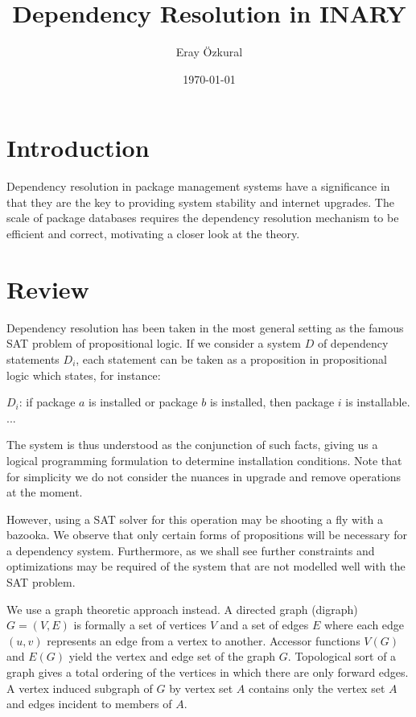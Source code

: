 \documentclass[a4paper,11pt]{article}
\title{ Dependency Resolution in INARY}
\author{Eray \"{O}zkural}
\date{\today}
\begin{document}
\maketitle

\section{Introduction}

Dependency resolution in package management systems have a
significance in that they are the key to providing system stability
and internet upgrades. The scale of package databases requires the
dependency resolution mechanism to be efficient and correct,
motivating a closer look at the theory.


\section{Review}

Dependency resolution has been taken in the most general setting as
the famous SAT problem of propositional logic. If we consider a system
$D$ of dependency statements $D_i$, each statement can be taken as a
proposition in propositional logic which states, for instance:

$D_i$: if package $a$ is installed or package $b$ is installed, then
package $i$ is installable.\\
...

The system is thus understood as the conjunction of such facts, giving
us a logical programming formulation to determine installation
conditions. Note that for simplicity we do not consider the nuances in
upgrade and remove operations at the moment.

However, using a SAT solver for this operation may be shooting a fly
with a bazooka. We observe that only certain forms of propositions
will be necessary for a dependency system. Furthermore, as we shall
see further constraints and optimizations may be required of the
system that are not modelled well with the SAT problem.

We use a graph theoretic approach instead. A directed graph (digraph)
$G=(V,E)$ is formally a set of vertices $V$ and a set of edges $E$
where each edge $(u,v)$ represents an edge from a vertex to another.
Accessor functions $V(G)$ and $E(G)$ yield the vertex and edge set of
the graph $G$. Topological sort of a graph gives a total ordering of
the vertices in which there are only forward edges. A vertex induced
subgraph of $G$ by vertex set $A$ contains only the vertex set $A$ and
edges incident to members of $A$.
\end{document}
